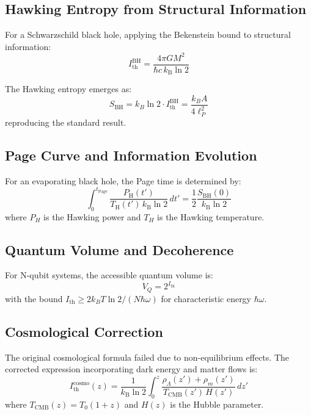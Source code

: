 \documentclass[twocolumn,10pt]{IEEEtran}
\begin{document}
\subsection{Hawking Entropy from Structural Information}

For a Schwarzschild black hole, applying the Bekenstein bound to structural information:
\begin{equation}
I_{\text{th}}^{\text{BH}} = \frac{4\pi GM^2}{\hbar c\,k_{\text{B}}\ln 2}
\end{equation}

The Hawking entropy emerges as:
\begin{equation}
S_{\text{BH}} = k_B \ln 2 \cdot I_{\text{th}}^{\text{BH}} = \frac{k_B A}{4\ell_P^2}
\end{equation}
reproducing the standard result.

\subsection{Page Curve and Information Evolution}

For an evaporating black hole, the Page time is determined by:
\begin{equation}
\int_{0}^{t_{\text{Page}}}\!\frac{P_{\text{H}}(t')}{T_{\text{H}}(t')\,k_{\text{B}}\ln 2}\,dt'=\frac{1}{2}\frac{S_{\text{BH}}(0)}{k_{\text{B}}\ln 2}
\end{equation}
where $P_H$ is the Hawking power and $T_H$ is the Hawking temperature.

\subsection{Quantum Volume and Decoherence}

For N-qubit systems, the accessible quantum volume is:
\begin{equation}
V_Q = 2^{I_{\text{th}}}
\end{equation}
with the bound $I_{\text{th}} \geq 2k_B T \ln 2 / (N\hbar\omega)$ for characteristic energy $\hbar\omega$.

\subsection{Cosmological Correction}

The original cosmological formula failed due to non-equilibrium effects. The corrected expression incorporating dark energy and matter flows is:
\begin{equation}
I_{\text{th}}^{\text{cosmo}}(z)=\frac{1}{k_{\text{B}}\ln 2}\int_{0}^{z}\!\frac{\rho_{\Lambda}(z')+\rho_{m}(z')}{T_{\text{CMB}}(z')\,H(z')}\,dz'
\end{equation}
where $T_{\text{CMB}}(z) = T_0(1+z)$ and $H(z)$ is the Hubble parameter.
\end{document}
